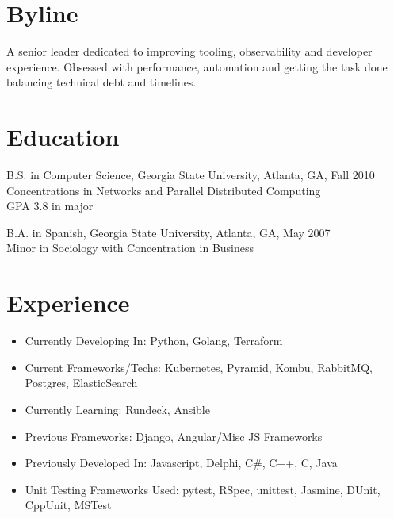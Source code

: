 \documentclass[margin]{res}
\begin{document}

\address{217 Rockyford Rd NE \\ Atlanta, GA 30317 \\
        (678) 773-1545 }

\begin{resume}

\section{Byline}
    A senior leader dedicated to improving tooling, observability and developer experience. Obsessed with
    performance, automation and getting the task done balancing technical debt and timelines.

\section{Education}
    B.S. in Computer Science, Georgia State University, Atlanta, GA, Fall 2010  \\
    Concentrations in Networks and Parallel Distributed Computing \\
    GPA 3.8 in major

    B.A. in Spanish, Georgia State University, Atlanta, GA, May 2007 \\
    Minor in Sociology with Concentration in Business


\section{Experience}
    \begin{itemize} \itemsep -2pt  %
        \item Currently Developing In: Python, Golang, Terraform
        \item Current Frameworks/Techs: Kubernetes, Pyramid, Kombu, RabbitMQ, Postgres, ElasticSearch
        \item Currently Learning: Rundeck, Ansible
        \item Previous Frameworks: Django, Angular/Misc JS Frameworks
        \item Previously Developed In: Javascript, Delphi, C\#, C++, C, Java
        \item Unit Testing Frameworks Used: pytest, RSpec, unittest, Jasmine, DUnit, CppUnit, MSTest
    \end{itemize}


\end{resume}
\end{document}
